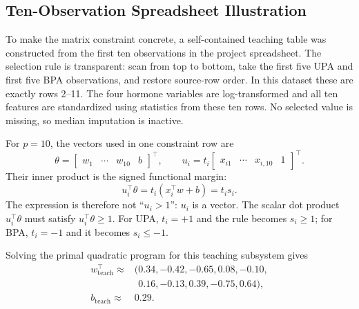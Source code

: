 \documentclass[11pt,a4paper]{article}
\numberwithin{equation}{section} %
\begin{document}
\subsection{Ten-Observation Spreadsheet Illustration}
\label{sec:worked-excel}

To make the matrix constraint concrete, a self-contained teaching table was constructed from the first ten observations in the project spreadsheet. The selection rule is transparent: scan from top to bottom, take the first five UPA and first five BPA observations, and restore source-row order. In this dataset these are exactly rows 2--11. The four hormone variables are log-transformed and all ten features are standardized using statistics from these ten rows. No selected value is missing, so median imputation is inactive.

For $p=10$, the vectors used in one constraint row are
\begin{equation}
    \theta=\begin{bmatrix}w_1&\cdots&w_{10}&b\end{bmatrix}^{\top},
    \qquad
    u_i=t_i\begin{bmatrix}x_{i1}&\cdots&x_{i,10}&1\end{bmatrix}^{\top}.
\end{equation}
Their inner product is the signed functional margin:
\begin{equation}
    u_i^{\top}\theta
    =t_i(x_i^{\top}w+b)
    =t_i s_i.
\end{equation}
The expression is therefore not ``$u_i>1$'': $u_i$ is a vector. The scalar dot product $u_i^{\top}\theta$ must satisfy $u_i^{\top}\theta\geq1$. For UPA, $t_i=+1$ and the rule becomes $s_i\geq1$; for BPA, $t_i=-1$ and it becomes $s_i\leq-1$.

Solving the primal quadratic program for this teaching subsystem gives
\begin{equation}
\begin{aligned}
w_{\mathrm{teach}}^{\top}
\approx{}&(0.34,-0.42,-0.65,0.08,-0.10,\\
&\phantom{(}0.16,-0.13,0.39,-0.75,0.64),\\
b_{\mathrm{teach}}\approx{}&0.29.
\end{aligned}
\end{equation}
\end{document}
